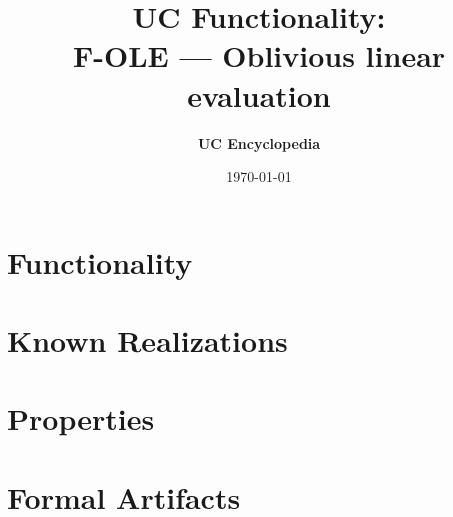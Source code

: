 \documentclass[11pt,a4paper]{article}
\title{\textbf{\Large UC Functionality:}\\[0.2em] \Large F-OLE --- Oblivious linear evaluation}
\author{\textbf{UC Encyclopedia}}
\date{\today}
\newtheorem{functionality}{Functionality}
\begin{document}
\maketitle

\begin{abstract}
\end{abstract}

\section{Functionality}

%

\section{Known Realizations}


\section{Properties}


\section{Formal Artifacts}

\end{document}
